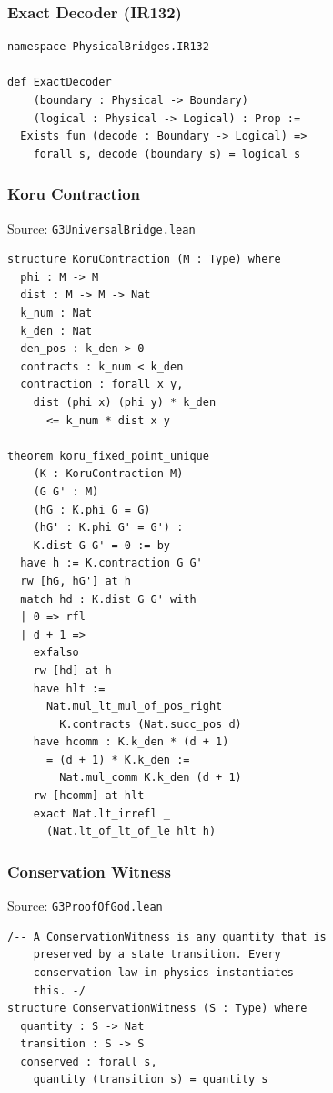 \documentclass[12pt,a4paper]{article}
\begin{document}
\subsubsection{Exact Decoder (IR132)}

\begin{lstlisting}[caption={ExactDecoder definition}]
namespace PhysicalBridges.IR132

def ExactDecoder
    (boundary : Physical -> Boundary)
    (logical : Physical -> Logical) : Prop :=
  Exists fun (decode : Boundary -> Logical) =>
    forall s, decode (boundary s) = logical s
\end{lstlisting}

\subsubsection{Koru Contraction}

Source: \texttt{G3UniversalBridge.lean}

\begin{lstlisting}[caption={KoruContraction and fixed-point uniqueness}]
structure KoruContraction (M : Type) where
  phi : M -> M
  dist : M -> M -> Nat
  k_num : Nat
  k_den : Nat
  den_pos : k_den > 0
  contracts : k_num < k_den
  contraction : forall x y,
    dist (phi x) (phi y) * k_den
      <= k_num * dist x y

theorem koru_fixed_point_unique
    (K : KoruContraction M)
    (G G' : M)
    (hG : K.phi G = G)
    (hG' : K.phi G' = G') :
    K.dist G G' = 0 := by
  have h := K.contraction G G'
  rw [hG, hG'] at h
  match hd : K.dist G G' with
  | 0 => rfl
  | d + 1 =>
    exfalso
    rw [hd] at h
    have hlt :=
      Nat.mul_lt_mul_of_pos_right
        K.contracts (Nat.succ_pos d)
    have hcomm : K.k_den * (d + 1)
      = (d + 1) * K.k_den :=
        Nat.mul_comm K.k_den (d + 1)
    rw [hcomm] at hlt
    exact Nat.lt_irrefl _
      (Nat.lt_of_lt_of_le hlt h)
\end{lstlisting}

\subsubsection{Conservation Witness}

Source: \texttt{G3ProofOfGod.lean}

\begin{lstlisting}[caption={ConservationWitness}]
/-- A ConservationWitness is any quantity that is
    preserved by a state transition. Every
    conservation law in physics instantiates
    this. -/
structure ConservationWitness (S : Type) where
  quantity : S -> Nat
  transition : S -> S
  conserved : forall s,
    quantity (transition s) = quantity s
\end{lstlisting}
\end{document}
